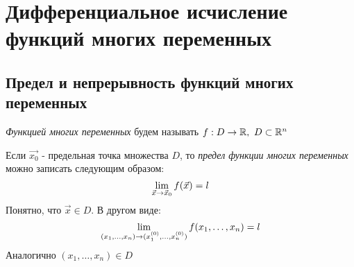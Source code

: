 
\section{Дифференциальное исчисление функций многих переменных}

\subsection{Предел и непрерывность функций многих переменных}

\begin{definition}
	\textit{Функцией многих переменных} будем называть $f: D \to \mathbb{R},\ D \subset \mathbb{R}^n$
\end{definition}

\begin{definition}
	Если $\vec{x_0}$ - предельная точка множества $D$, то \textit{предел функции многих переменных} можно записать следующим образом:
	\[
		\lim\limits_{\vec{x} \to \vec{x}_0} f(\vec{x}) = l
	\]
	Понятно, что $\vec{x} \in D$. В другом виде:
	\[
		\lim\limits_{(x_1, \ldots, x_n) \to (x_1^{(0)}, \ldots, x_n^{(0)})} f(x_1, \ldots, x_n) = l
	\]
	Аналогично $(x_1, \ldots, x_n) \in D$
\end{definition}


